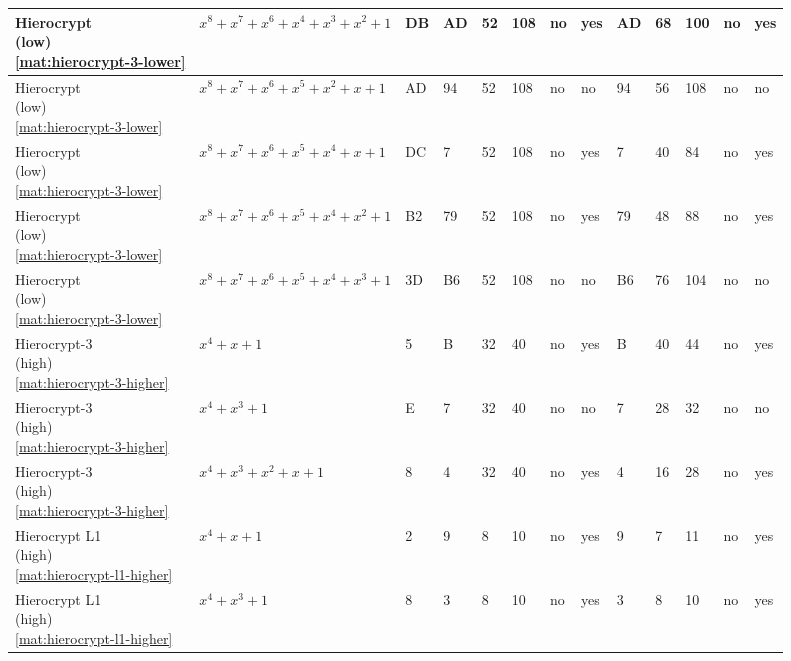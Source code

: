 \begin{tiny}
\begin{longtable}{|l|l|l|l|l|l|l|l|l|l|l|l|l|}
\shortstack{Hierocrypt \\ (low) \\ \eqref{mat:hierocrypt-3-lower}} & $x^8 + x^7 + x^6 + x^4 + x^3 + x^2 + 1$ & DB & AD & 52 & 108 & no & yes & AD & 68 & 100 & no & yes \\ \hline
\shortstack{Hierocrypt \\ (low) \\ \eqref{mat:hierocrypt-3-lower}} & $x^8 + x^7 + x^6 + x^5 + x^2 + x + 1$ & AD & 94 & 52 & 108 & no & no & 94 & 56 & 108 & no & no \\ \hline
\shortstack{Hierocrypt \\ (low) \\ \eqref{mat:hierocrypt-3-lower}} & $x^8 + x^7 + x^6 + x^5 + x^4 + x + 1$ & DC & 7 & 52 & 108 & no & yes & 7 & 40 & 84 & no & yes \\ \hline
\shortstack{Hierocrypt \\ (low) \\ \eqref{mat:hierocrypt-3-lower}} & $x^8 + x^7 + x^6 + x^5 + x^4 + x^2 + 1$ & B2 & 79 & 52 & 108 & no & yes & 79 & 48 & 88 & no & yes \\ \hline
\shortstack{Hierocrypt \\ (low) \\ \eqref{mat:hierocrypt-3-lower}} & $x^8 + x^7 + x^6 + x^5 + x^4 + x^3 + 1$ & 3D & B6 & 52 & 108 & no & no & B6 & 76 & 104 & no & no \\ \hline
\shortstack{Hierocrypt-3 \\ (high) \\ \eqref{mat:hierocrypt-3-higher}} & $x^4 + x + 1$ & 5 & B & 32 & 40 & no & yes & B & 40 & 44 & no & yes \\ \hline
\shortstack{Hierocrypt-3 \\ (high) \\ \eqref{mat:hierocrypt-3-higher}} & $x^4 + x^3 + 1$ & E & 7 & 32 & 40 & no & no & 7 & 28 & 32 & no & no \\ \hline
\shortstack{Hierocrypt-3 \\ (high) \\ \eqref{mat:hierocrypt-3-higher}} & $x^4 + x^3 + x^2 + x + 1$ & 8 & 4 & 32 & 40 & no & yes & 4 & 16 & 28 & no & yes \\ \hline
\shortstack{Hierocrypt L1 \\ (high) \\ \eqref{mat:hierocrypt-l1-higher}} & $x^4 + x + 1$ & 2 & 9 & 8 & 10 & no & yes & 9 & 7 & 11 & no & yes \\ \hline
\shortstack{Hierocrypt L1 \\ (high) \\ \eqref{mat:hierocrypt-l1-higher}} & $x^4 + x^3 + 1$ & 8 & 3 & 8 & 10 & no & yes & 3 & 8 & 10 & no & yes \\ \hline

\end{longtable}
\end{tiny}
